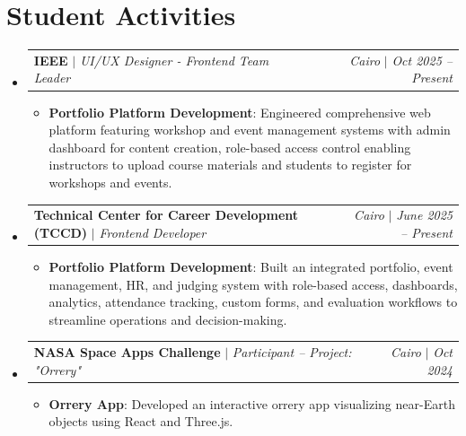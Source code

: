 \documentclass[letterpaper,11pt]{article}
\makeatletter
\newcommand{\resumeItem}[2]{\item\small{\textbf{#1}{: #2 \vspace{-2pt}}}}
\newcommand{\resumeActivitySubheading}[4]{
  \vspace{-1pt}\item
    \begin{tabular*}{0.97\textwidth}{l@{\extracolsep{\fill}}r}
      \textbf{#1} $|$ \textit{\small#3} & \textit{\small#2} $|$ \textit{\small #4} \\
    \end{tabular*}\vspace{-5pt}
}
\newcommand{\resumeSubHeadingListStart}{\begin{itemize}[leftmargin=*]}
\newcommand{\resumeSubHeadingListEnd}{\end{itemize}}
\newcommand{\resumeItemListStart}{\begin{itemize}}
\newcommand{\resumeItemListEnd}{\end{itemize}\vspace{-5pt}}
\makeatother
\begin{document}
\section{Student Activities}
  \resumeSubHeadingListStart
    \resumeActivitySubheading
      {IEEE}{Cairo}{UI/UX Designer - Frontend Team Leader}{Oct 2025 -- Present}
      \resumeItemListStart
        \resumeItem{Portfolio Platform Development}
          {Engineered comprehensive web platform featuring workshop and event management systems with admin dashboard for content creation, role-based access control enabling instructors to upload course materials and students to register for workshops and events.}
      \resumeItemListEnd
    \vspace{4pt}
    \resumeActivitySubheading
      {Technical Center for Career Development (TCCD)}{Cairo}{Frontend Developer}{June 2025 -- Present}
      \resumeItemListStart
        \resumeItem{Portfolio Platform Development}
          {Built an integrated portfolio, event management, HR, and judging system with role-based access, dashboards, analytics, attendance tracking, custom forms, and evaluation workflows to streamline operations and decision-making.}
      \resumeItemListEnd
    \vspace{4pt}
    \resumeActivitySubheading
      {NASA Space Apps Challenge}{Cairo}{Participant -- Project: "Orrery"}{Oct 2024}
      \resumeItemListStart
        \resumeItem{Orrery App}
          {Developed an interactive orrery app visualizing near-Earth objects using React and Three.js.}
      \resumeItemListEnd
  \resumeSubHeadingListEnd
\end{document}
